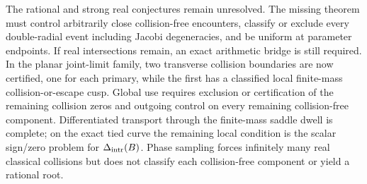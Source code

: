 \documentclass[11pt]{article}
\begin{document}
The rational and strong real conjectures remain unresolved.  The missing
theorem must control arbitrarily close collision-free encounters, classify or
exclude every double-radial event including Jacobi degeneracies, and be uniform
at parameter endpoints.  If real intersections remain, an exact arithmetic
bridge is still required. In the planar joint-limit family, two transverse
collision boundaries are now certified, one for each primary, while the first
has a classified local finite-mass collision-or-escape cusp.  Global use
requires exclusion or certification of the remaining collision zeros and
outgoing control on every remaining collision-free component.  Differentiated
transport through the finite-mass saddle dwell is complete; on the exact tied curve the remaining
local condition is the scalar
sign/zero problem for $\Delta_{\rm intr}(B)$.  Phase sampling forces infinitely
many real classical collisions but does not classify each collision-free
component or yield a rational root.


\end{document}
